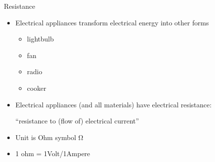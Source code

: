 \documentclass[svgnames,x11names]{beamer}
\begin{document}
\begin{frame}{Resistance}
  \begin{itemize}
  \item Electrical appliances transform electrical energy into other
    forms
    \begin{itemize}
    \item lightbulb
    \item fan
    \item radio
    \item cooker
    \end{itemize}

  \item Electrical appliances (and all materials) have
    \alert{electrical resistance}:
    \begin{block}{}
      ``resistance to (flow of) electrical current''
    \end{block}
  \item Unit is \alert{Ohm} symbol \si{\ohm}
  \item 1 ohm = 1Volt/1Ampere
  \end{itemize}
\end{frame}
\end{document}
